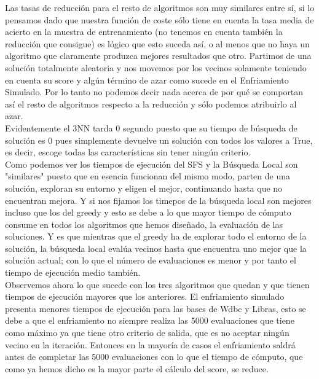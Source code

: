 \documentclass[10pt,a4paper]{article}
\begin{document}
Las tasas de reducción para el resto de algoritmos son muy similares entre sí, si lo pensamos dado que nuestra función de coste sólo tiene en cuenta la tasa media de acierto en la muestra de entrenamiento (no tenemos en cuenta también la reducción que consigue) es lógico que esto suceda así, o al menos que no haya un algoritmo que claramente produzca mejores resultados que otro. Partimos de una solución totalmente aleatoria y nos movemos por los vecinos solamente teniendo en cuenta su score y algún término de azar como sucede en el Enfriamiento Simulado. Por lo tanto no podemos decir nada acerca de por qué se comportan así el resto de algoritmos respecto a la reducción y sólo podemos atribuirlo al azar.\\




Evidentemente el 3NN tarda 0 segundo puesto que su tiempo de búsqueda de solución es 0 pues simplemente devuelve un solución con todos los valores a True, es decir, escoge todas las características sin tener ningún criterio.\\

Como podemos ver los tiempos de ejecución del SFS y la Búsqueda Local son "similares" puesto que en esencia funcionan del mismo modo, parten de una solución, exploran su entorno y eligen el mejor, continuando hasta que no encuentran mejora. Y si nos fijamos los timepos de la búsqueda local son mejores incluso que los del greedy y esto se debe a lo que mayor tiempo de cómputo consume en todos los algoritmos que hemos diseñado, la evaluación de las soluciones. Y es que mientras que el greedy ha de explorar todo el entorno de la solución, la búsqueda local evalúa vecinos hasta que encuentra uno mejor que la solución actual; con lo que el número de evaluaciones es menor y por tanto el tiempo de ejecución medio también.\\

Observemos ahora lo que sucede con los tres algoritmos que quedan y que tienen tiempos de ejecución mayores que los anteriores. El enfriamiento simulado presenta menores tiempos de ejecución para las bases de Wdbc y Libras, esto se debe a que el enfriamiento no siempre realiza las 5000 evaluaciones que tiene como máximo ya que tiene otro criterio de salida, que es no aceptar ningún vecino en la iteración. Entonces en la mayoría de casos el enfriamiento saldrá antes de completar las 5000 evaluaciones con lo que el tiempo de cómputo, que como ya hemos dicho es la mayor parte el cálculo del score, se reduce.\\
\end{document}

